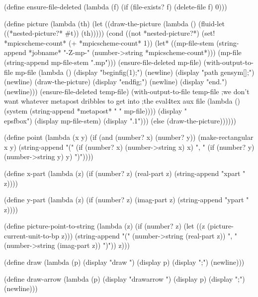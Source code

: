 {(define ensure-file-deleted
  (lambda (f)
    (if (file-exists? f) (delete-file f) 0)))

(define picture
  (lambda (th)
    (let ((draw-the-picture
            (lambda ()
              (fluid-let ((*nested-picture?* #t))
                (th)))))
      (cond ((not *nested-picture?*)
             (set! *mpicscheme-count* (+ *mpicscheme-count* 1))
             (let* ((mp-file-stem (string-append
                                    *jobname* "-Z-mp-"
                                    (number->string *mpicscheme-count*)))
                    (mp-file (string-append mp-file-stem ".mp")))
               (ensure-file-deleted mp-file)
               (with-output-to-file mp-file
                 (lambda ()
                   (display "beginfig(1);") (newline)
                   (display "path gensym[];") (newline)
                   (draw-the-picture)
                   (display "endfig;") (newline)
                   (display "end.") (newline)))
               (ensure-file-deleted temp-file)
               (with-output-to-file temp-file
                 ;we don't want whatever metapost dribbles to get into 
                 ;the eval4tex aux file
                 (lambda ()
                   (system (string-append *metapost* " " mp-file))))
               (display "\\epsfbox{")
               (display mp-file-stem)
               (display ".1}")))
            (else (draw-the-picture))))))

(define point 
  (lambda (x y)
    (if (and (number? x) (number? y))
        (make-rectangular x y)
        (string-append "("
                       (if (number? x) (number->string x) x)
                       ", "
                       (if (number? y) (number->string y) y)
                       ")"))))

(define x-part
  (lambda (z)
    (if (number? z) (real-part z)
        (string-append "xpart " z))))

(define y-part
  (lambda (z)
    (if (number? z) (imag-part z)
        (string-append "ypart " z))))

(define picture-point-to-string
  (lambda (z)
    (if (number? z)
        (let ((z (picture-current-unit-to-bp z)))
          (string-append "(" (number->string (real-part z))
                         ", " (number->string (imag-part z)) ")"))
        z)))

(define draw
  (lambda (p)
    (display "draw ") (display p) (display ";")
    (newline)))

(define draw-arrow
  (lambda (p)
    (display "drawarrow ") (display p) (display ";")
    (newline)))

}

